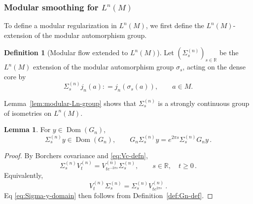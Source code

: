 \documentclass[11pt,a4paper]{article}
\theoremstyle{plain}
\numberwithin{theorem}{section}
\theoremstyle{definition}
\newtheorem{definition}[theorem]{Definition}
\newtheorem{lemma}[theorem]{Lemma}
\newcommand{\?}{\overset{?}{=}}
\newcommand{\defeq}{\mathrel{\mathop:}=}
\newcommand{\s}{\sigma}
\DeclareMathOperator{\Dom}{Dom}
\begin{document}
\subsubsection{Modular smoothing for \texorpdfstring{$L^n(M)$}{LnM} }
\label{subsec:modular-smoothing}

To define a modular regularization in $L^n(M)$, we first define the $L^n(M)$-extension of the modular automorphism group.
\begin{definition}[Modular flow extended to $L^n(M)$]
    Let \((\Sigma_s^{(n)})_{s\in\mathbb R}\) be the \(L^n(M)\) extension of the modular automorphism group $\s_s$, acting on the dense core by
\begin{equation}
  \Sigma_s^{(n)} j_n(a)\defeq j_n(\sigma_s(a)), \qquad a\in M .
\end{equation}
\end{definition}
Lemma~\ref{lem:modular-Ln-group} shows that \(\Sigma_s^{(n)}\) is a strongly continuous group of isometries on \(L^n(M)\).

\begin{lemma}
    For $y\in\Dom(G_n)$,
\begin{equation}\label{eq:Sigma-y-domain}
  \Sigma_s^{(n)}y\in\Dom(G_n), \qquad G_n\Sigma_s^{(n)}y=e^{2\pi s}\Sigma_s^{(n)}G_ny\,.
\end{equation}
\end{lemma}
\begin{proof}
    By Borchers covariance and \eqref{eq:Vc-defn},
\begin{equation}
  \Sigma_s^{(n)}V_t^{(n)}=V_{te^{-2\pi s}}^{(n)}\Sigma_s^{(n)},
  \qquad s\in\mathbb R,
  \quad t\geq 0\,.
\end{equation}
Equivalently,
\begin{equation}\label{eq:semigroup-covariance}
  V_t^{(n)}\Sigma_s^{(n)}=\Sigma_s^{(n)}V_{te^{2\pi s}}^{(n)}\,.
\end{equation}
Eq \eqref{eq:Sigma-y-domain} then follows from Definition~\ref{def:Gn-def}.
\end{proof}
\end{document}
